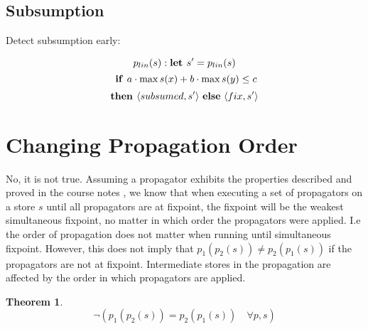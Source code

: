 \documentclass[a4paper, 11pt]{article}
\newtheorem{theorem}{Theorem}[section]
\begin{document}
\subsection*{Subsumption}
Detect subsumption early:

$$p_{lin}(s):  \text{\textbf{let }} s' = p_{lin}(s)$$
$$\text{ \textbf{if }} a \cdot \max s(x) + b \cdot \max s(y) \leq c$$
$$\text{\textbf{then }} \langle subsumed, s' \rangle \text{ \textbf{else} } \langle fix, s' \rangle$$


\section*{Changing Propagation Order}
No, it is not true. Assuming a propagator exhibits the properties described and proved in the course notes \citep{schulte_notes}, we know that when executing a set of propagators on a store $s$ until all propagators are at fixpoint, the fixpoint will be the weakest simultaneous fixpoint, no matter in which order the propagators were applied. I.e the order of propagation does not matter when running until simultaneous fixpoint. However, this does not imply that $p_1(p_2(s)) \neq p_2(p_1(s))$ if the propagators are not at fixpoint. Intermediate stores in the propagation are affected by the order in which propagators are applied.

\begin{theorem}
$$\neg(p_1(p_2(s)) = p_2(p_1(s)) \quad \forall p, s)$$
\end{theorem}
\end{document}
